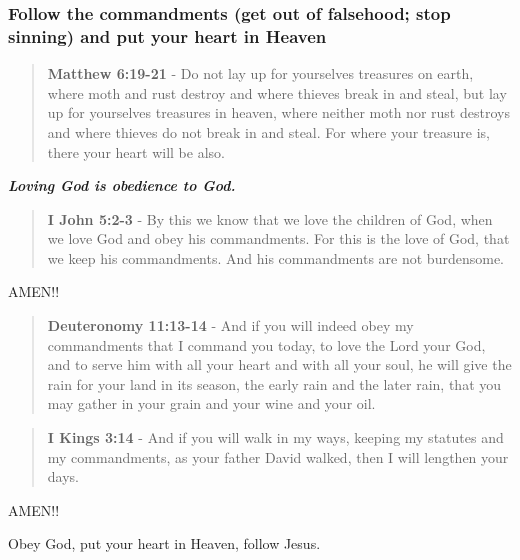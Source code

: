 \documentclass[11pt]{article}
\begin{document}
\subsubsection{Follow the commandments (get out of falsehood; stop sinning) and put your heart in Heaven}
\label{sec:org4b4f68b}
\begin{quote}
\textbf{Matthew 6:19-21} - Do not lay up for yourselves treasures on earth, where moth and rust destroy and where thieves break in and steal, but lay up for yourselves treasures in heaven, where neither moth nor rust destroys and where thieves do not break in and steal. For where your treasure is, there your heart will be also.
\end{quote}

\emph{\textbf{Loving God is obedience to God.}}

\begin{quote}
\textbf{I John 5:2-3} - By this we know that we love the children of God, when we love God and obey his commandments. For this is the love of God, that we keep his commandments. And his commandments are not burdensome.
\end{quote}

AMEN!!

\begin{quote}
\textbf{Deuteronomy 11:13-14} - And if you will indeed obey my commandments that I command you today, to love the Lord your God, and to serve him with all your heart and with all your soul, he will give the rain for your land in its season, the early rain and the later rain, that you may gather in your grain and your wine and your oil.
\end{quote}

\begin{quote}
\textbf{I Kings 3:14} - And if you will walk in my ways, keeping my statutes and my commandments, as your father David walked, then I will lengthen your days.
\end{quote}

AMEN!!

Obey God, put your heart in Heaven, follow Jesus.
\end{document}
